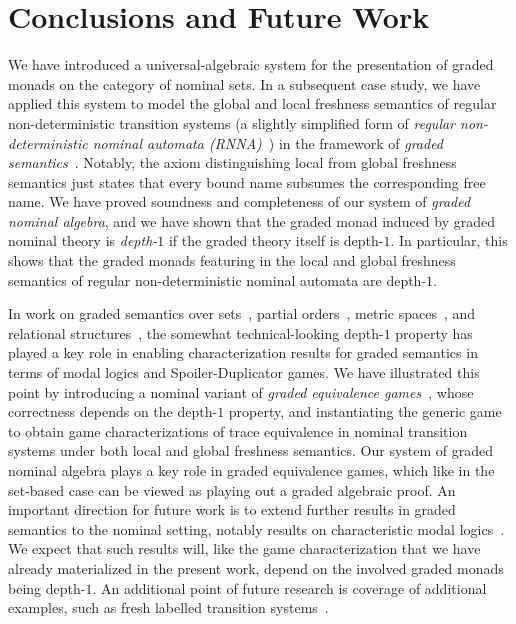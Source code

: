 \documentclass[a4paper,UKenglish,cleveref,thm-restate,numberwithinsect,final]{lipics-v2021}
\theoremstyle{plain}
\numberwithin{equation}{section}
\newcommand{\+}[1]{\mathcal{#1}\xspace}
\theoremstyle{definition}
\begin{document}
\section{Conclusions and Future Work}

\noindent We have introduced a universal-algebraic system for the
presentation of graded monads on the category of nominal sets. In a
subsequent case study, we have applied this system to model the global
and local freshness semantics of regular non-deterministic transition
systems (a slightly simplified form of \emph{regular non-deterministic
  nominal automata (RNNA)}~\cite{SchroderEA17}) in the framework of
\emph{graded semantics}~\cite{MiliusEA15,DorschEA19}. Notably, the
axiom distinguishing local from global freshness semantics just states
that every bound name subsumes the corresponding free name. %
We have proved soundness and completeness of our system of
\emph{graded nominal algebra}, and we have shown that the graded monad
induced by graded nominal theory is \emph{depth-$1$} if the graded
theory itself is depth-$1$. In particular, this shows that the graded
monads featuring in the local and global freshness semantics of
regular non-deterministic nominal automata are depth-$1$.

In work on graded semantics over
sets~\cite{MiliusEA15,DorschEA19,FordEA22}, partial
orders~\cite{FordEA21}, metric spaces~\cite{ForsterEA25a}, and
relational structures~\cite{ForsterEA25b}, the somewhat
technical-looking depth-$1$ property has played a key role in enabling
characterization results for graded semantics in terms of modal logics
and Spoiler-Duplicator games. We have illustrated this point by
introducing a nominal variant of \emph{graded equivalence
  games}~\cite{FordEA22}, whose correctness depends on the depth-$1$
property, and instantiating the generic game to obtain game
characterizations of trace equivalence in nominal transition systems
under both local and global freshness semantics. Our system of graded
nominal algebra plays a key role in graded equivalence games, which
like in the set-based case can be viewed as playing out a graded
algebraic proof. An important direction for future work is to extend
further results in graded semantics to the nominal setting, notably
results on characteristic modal
logics~\cite{MiliusEA15,DorschEA19}. We expect that such results will,
like the game characterization that we have already materialized in
the present work, depend on the involved graded monads being
\mbox{depth-$1$}. An additional point of future research is coverage
of additional examples, such as fresh labelled transition
systems~\cite{BandukaraTzevelekos25}.
\end{document}
